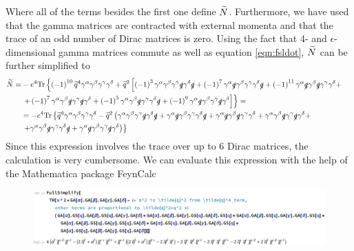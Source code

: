 Where all of the terms besides the first one define $\widetilde{N}$. Furthermore, we have used that the gamma matrices are contracted with external momenta and that the trace of an odd number of Dirac matrices is zero. Using the fact that 4- and $\epsilon$-dimensional gamma matrices commute as well as equation \ref{eqn:fsldot}, $\widetilde{N}$ can be further simplified to
\begin{align*}
\widetilde{N} = & -e^4 \mathrm{Tr} \left\lbrace \left( -1 \right)^{10} \widetilde{q}^4 \gamma^{\alpha} \gamma^{\beta} \gamma^{\gamma} \gamma^{\delta} + \widetilde{q}^2 \left[ \left( -1 \right) ^3  \gamma^{\alpha} \gamma^{\beta} \gamma^{\gamma} \slashed{q} \gamma^{\delta} \slashed{q}  + \left( -1 \right)^7 \gamma^{\alpha} \slashed{q} \gamma^{\beta} \gamma^{\gamma} \gamma^{\delta} \slashed{q} + \left( -1 \right)^{11} \gamma^{\alpha} \slashed{q} \gamma^{\beta} \slashed{q} \gamma^{\gamma} \gamma^{\delta} + \right. \right. & \\
& \left. \left. + \left( -1 \right)^7 \gamma^{\alpha} \gamma^{\beta} \slashed{q} \gamma^{\gamma} \slashed{q} \gamma^{\delta} + \left( -1 \right)^5 \gamma^{\alpha} \gamma^{\beta} \slashed{q} \gamma^{\gamma} \gamma^{\delta} \slashed{q} + \left( -1 \right)^9 \gamma^{\alpha} \slashed{q} \gamma^{\beta} \gamma^{\gamma} \slashed{q} \gamma^{\delta} \right] \right\rbrace = & \\
& = -e^4 \mathrm{Tr} \left\lbrace \widetilde{q}^4 \gamma^{\alpha} \gamma^{\beta} \gamma^{\gamma} \gamma^{\delta} - \widetilde{q}^2 \left( \gamma^{\alpha} \gamma^{\beta} \gamma^{\gamma} \slashed{q} \gamma^{\delta} \slashed{q} + \gamma^{\alpha} \slashed{q} \gamma^{\beta} \gamma^{\gamma} \gamma^{\delta} \slashed{q} + \gamma^{\alpha} \slashed{q} \gamma^{\beta} \slashed{q} \gamma^{\gamma} \gamma^{\delta} + \gamma^{\alpha} \gamma^{\beta} \slashed{q} \gamma^{\gamma} \slashed{q} \gamma^{\delta} + \right. \right. & \\
& \left. \left. + \gamma^{\alpha} \gamma^{\beta} \slashed{q} \gamma^{\gamma} \gamma^{\delta} \slashed{q} + \gamma^{\alpha} \slashed{q} \gamma^{\beta} \gamma^{\gamma} \slashed{q} \gamma^{\delta} \right) \right\rbrace &
\end{align*}
Since this expression involves the trace over up to 6 Dirac matrices, the calculation is very cumbersome. We can evaluate this expression with the help of the Mathematica package FeynCalc \cite{FeynCalc,FeynCalc2} 
\begin{figure}[h!]
  \begin{center}
    \includegraphics[width=1.05\textwidth]{Figures/Trace_4ptfct_Mathematica}
  \end{center}
  \setlength{\belowcaptionskip}{-20pt}
  \caption*{}
\end{figure} \\

